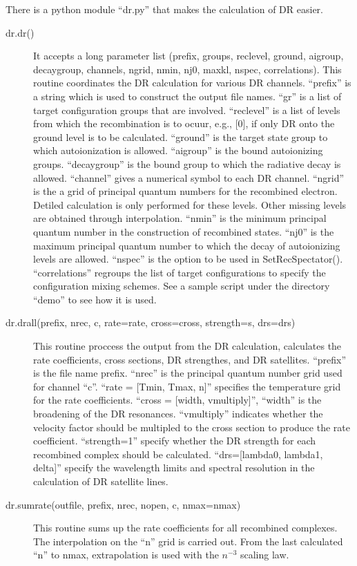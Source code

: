 \documentclass[12pt]{article}
\begin{document}
There is a python module ``dr.py'' that makes the calculation of DR easier. 
\begin{description}
\item[dr.dr()] 
It accepts a long parameter list (prefix, groups, reclevel, ground, aigroup,
decaygroup, channels, ngrid, nmin, nj0, maxkl, nspec, correlations). 
This routine coordinates the DR calculation for various DR
channels. ``prefix'' is a string which is used to construct the output file
names. ``gr'' is a list of target configuration groups that are
involved. ``reclevel'' is a list of levels from which the recombination is to
ocuur, e.g., [0], if only DR onto the ground level is to be
calculated. ``ground'' is the target state group to which autoionization is
allowed. ``aigroup'' is the bound autoionizing groups. ``decaygroup'' is the
bound group to which the radiative decay is allowed. ``channel'' gives a
numerical symbol to each DR channel. ``ngrid'' is the a grid of principal
quantum numbers for the recombined electron. Detiled calculation is only
performed for these levels. Other missing levels are obtained through
interpolation. ``nmin'' is the minimum principal quantum number in the
construction of recombined states. ``nj0'' is the maximum principal quantum
number to which the decay of autoionizing levels are allowed. ``nspec'' is the
option to be used in SetRecSpectator(). ``correlations'' regroups the list of
target configurations to specify the configuration mixing schemes. See a
sample script under the directory ``demo'' to see how it is used.

\item[dr.drall(prefix, nrec, c, rate=rate, cross=cross, strength=s, drs=drs)]
This routine proccess the output from the DR calculation, calculates the rate
coefficients, cross sections, DR strengthes, and DR satellites. ``prefix'' is
the file name 
prefix. ``nrec'' is the principal quantum number grid used for channel
``c''. ``rate = [Tmin, Tmax, n]'' specifies the temperature grid for the rate
coefficients. ``cross = [width, vmultiply]'', ``width'' is the broadening of
the DR resonances. ``vmultiply'' indicates whether the velocity factor should
be multipled to the cross section to produce the rate
coefficient. ``strength=1'' specify whether the DR strength for each
recombined complex should be calculated. ``drs=[lambda0, lambda1, delta]''
specify the wavelength limits and spectral resolution in the calculation of DR
satellite lines. 

\item[dr.sumrate(outfile, prefix, nrec, nopen, c, nmax=nmax)]
This routine sums up the rate coefficients for all recombined complexes. The
interpolation on the ``n'' grid is carried out. From the last calculated ``n''
to nmax, extrapolation is used with the $n^{-3}$ scaling law.
\end{description}
\end{document}
